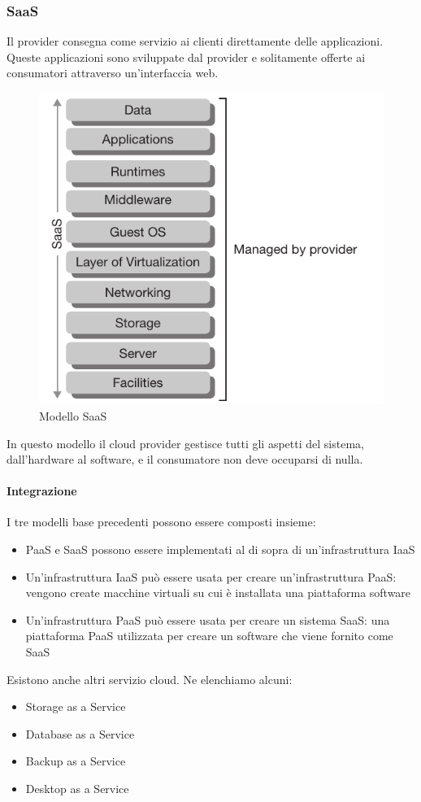 \documentclass{article}
\begin{document}
\subsubsection{SaaS}
Il provider consegna come servizio ai clienti direttamente delle applicazioni. Queste applicazioni sono sviluppate dal provider e solitamente offerte ai consumatori attraverso un’interfaccia web.
\begin{figure}[H]
    \centering
    \includegraphics[scale=0.5]{img/saas.png}
    \caption{Modello SaaS}
\end{figure}
\noindent
In questo modello il cloud provider gestisce tutti gli aspetti del sistema, dall’hardware al software, e il consumatore non deve occuparsi di nulla.\\

\paragraph{Integrazione}
I tre modelli base precedenti possono essere composti insieme:
\begin{itemize}
    \item PaaS e SaaS possono essere implementati al di sopra di un’infrastruttura IaaS
    \item Un’infrastruttura IaaS può essere usata per creare un’infrastruttura PaaS: vengono create macchine virtuali su cui è installata una piattaforma software
    \item Un’infrastruttura PaaS può essere usata per creare un sistema SaaS: una piattaforma PaaS utilizzata per creare un software che viene fornito come SaaS
\end{itemize}
Esistono anche altri servizio cloud. Ne elenchiamo alcuni:
\begin{itemize}
    \item Storage as a Service
    \item Database as a Service
    \item Backup as a Service
    \item Desktop as a Service
\end{itemize}
\end{document}
